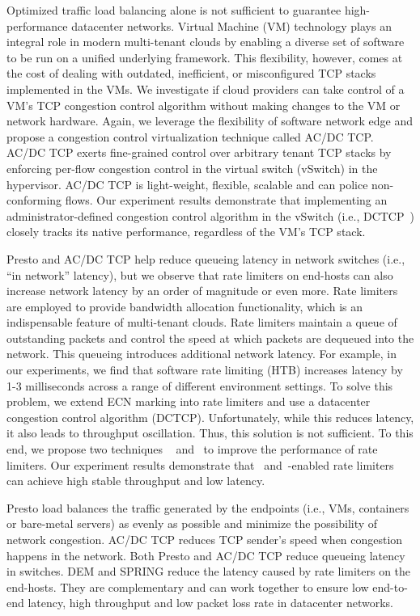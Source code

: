 Optimized traffic load balancing alone is not sufficient to 
guarantee high-performance datacenter networks. 
Virtual Machine (VM) technology plays an integral role in
modern multi-tenant clouds by enabling a diverse set of software to be run
on a unified underlying framework. This flexibility, however,
comes at the cost of dealing with outdated, inefficient,
or misconfigured TCP stacks implemented in the VMs. We investigate if cloud providers can take control of a VM's
TCP congestion control algorithm without making changes
to the VM or network hardware. 
Again, we leverage the flexibility of software network edge and propose 
a congestion control virtualization technique called AC/DC TCP.
AC/DC TCP exerts fine-grained control over arbitrary tenant
TCP stacks by enforcing per-flow congestion control in
the virtual switch (vSwitch) in the hypervisor. AC/DC TCP is light-weight,
flexible, scalable and can police non-conforming flows. Our experiment results demonstrate that 
implementing an administrator-defined congestion control algorithm in the
vSwitch (i.e., DCTCP~\cite{dctcp}) closely tracks its native performance,
regardless of the VM's TCP stack.

Presto and AC/DC TCP help reduce queueing latency in 
network switches (i.e., ``in network'' latency), but we observe that 
rate limiters on end-hosts can also increase network latency by an order of magnitude or even more. 
Rate limiters are employed to provide bandwidth allocation functionality, 
which is an indispensable feature of multi-tenant clouds. Rate limiters
maintain a queue of outstanding packets and control the speed at which
packets are dequeued into the network. This queueing introduces
additional network latency. For example, in our experiments, we find
that software rate limiting (HTB) increases latency by 1-3 milliseconds
across a range of different environment settings. 
To solve
this problem, we extend ECN marking into rate limiters and use a datacenter
congestion control algorithm (DCTCP). Unfortunately, while this reduces
latency, it also leads to throughput oscillation. Thus, this solution is
not sufficient.
To this end, we propose two techniques \textemdash\xspace~\dem{} and~\spring{} to 
improve the performance of rate limiters.
Our experiment results demonstrate that~\dem{} and~\spring{}-enabled
rate limiters can achieve high stable throughput and low latency.

Presto load balances the traffic generated by the endpoints (i.e., VMs, containers or bare-metal servers) 
as evenly as possible and minimize the possibility of network congestion. AC/DC TCP reduces TCP sender's 
speed when congestion happens in the network. Both Presto and AC/DC TCP reduce queueing latency in switches. 
DEM and SPRING reduce the latency caused by rate limiters on the end-hosts. They are complementary 
and can work together to ensure low end-to-end latency, high throughput and low packet loss rate 
in datacenter networks.




